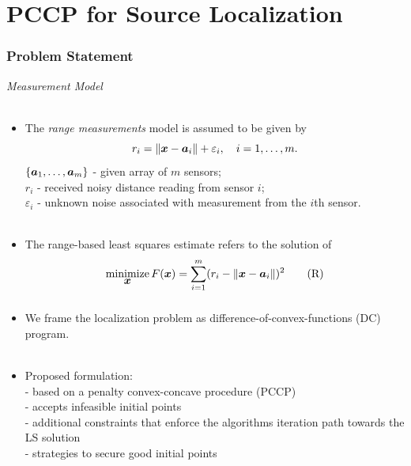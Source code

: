 \documentclass [t] {beamer} %
\begin{document}
\section[Chapter 3]{PCCP for Source Localization}


\begin{frame} %
\frametitle{Problem Statement }
{\large \textit{Measurement Model}} \\~\\
\normalsize
\begin{itemize}
\item
The \textit{range measurements} model is assumed to be given by
\begin{equation} 
\nonumber
r_i = \|{\mbox{\boldmath$x$}} - {\mbox{\boldmath$a$}}_i\| + \varepsilon_i, \quad i = 1, \ldots , m.
\end{equation}  
$\{\mbox{\boldmath$a$}_1,\ldots, \mbox{\boldmath$a$}_m\}$ - given array of $m$ sensors;\\
$r_i$ - received noisy distance reading from sensor $i$; \\
$\varepsilon_i$ - unknown noise associated with measurement from the $i$th sensor. \\ ~\\

\item
The range-based least squares  estimate refers to the solution of%
\begin{equation} \label{R-LS} 
\mathop{\mbox{minimize}}_{\mbox{\boldmath$x$}} F(\mbox{\boldmath$x$})=\sum_{i=1}^{m} (r_i - \|{\mbox{\boldmath$x$}} - {\mbox{\boldmath$a$}}_i\|)^2	\tag{R}
\end{equation}
\end{itemize}
\end{frame}

\begin{frame} %
\frametitle{}
\phantom{m}
\begin{itemize}
\item
We frame the localization problem as difference-of-convex-functions
(DC) program.
\\~\\
\item
Proposed formulation:\\
- based on a penalty convex-concave procedure (PCCP)\\
- accepts infeasible initial points\\
- additional constraints that enforce the algorithms iteration path
towards the LS solution\\
- strategies to secure good initial points
\end{itemize}
\end{frame}
\end{document}
